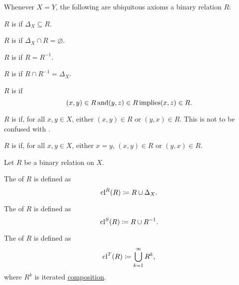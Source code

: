 \begin{definition}
  Whenever \( X = Y \), the following are ubiquitous axioms a binary relation \( R \):
  \begin{thmenum}[resume=def:binary_relation]
     \( R \) is  if \( \Delta_X \subseteq R \).

     \( R \) is  if \( \Delta_X \cap R = \varnothing \).

     \( R \) is  if \( R = R^{-1} \).

     \( R \) is  if \( R \cap R^{-1} = \Delta_X \).

     \( R \) is  if
    \begin{equation*}
      (x, y) \in R \mathop{\text{and}} (y, z) \in R \mathop{\text{implies}} (x, z) \in R.
    \end{equation*}

     \( R \) is  if, for all \( x, y \in X \), either \( (x, y) \in R \) or \( (y, x) \in R \). This is not to be confused with .

     \( R \) is  if, for all \( x, y \in X \), either \( x = y \), \( (x, y) \in R \) or \( (y, x) \in R \).
  \end{thmenum}
\end{definition}

\begin{definition}\label{def:derived_relations}
  Let \( R \) be a binary relation on \( X \).

  \begin{thmenum}
     The  of \( R \) is defined as
    \begin{equation*}
      \operatorname{cl}^R(R) \coloneqq R \cup \Delta_X.
    \end{equation*}

     The  of \( R \) is defined as
    \begin{equation*}
      \operatorname{cl}^S(R) \coloneqq R \cup R^{-1}.
    \end{equation*}

     The  of \( R \) is defined as
    \begin{equation*}
      \operatorname{cl}^T(R) \coloneqq \bigcup_{k=1}^\infty R^k,
    \end{equation*}
    where \( R^k \) is iterated \hyperref[def:binary_relation/composition]{composition}.
  \end{thmenum}
\end{definition}

